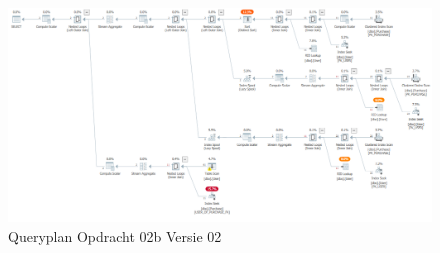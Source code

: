 
\begin{figure}[H]
    \centering
    \includegraphics[width=1\textwidth]{image/marc/opdracht-02b.PNG}
    \caption{Queryplan Opdracht 02b Versie 02}
\end{figure}


